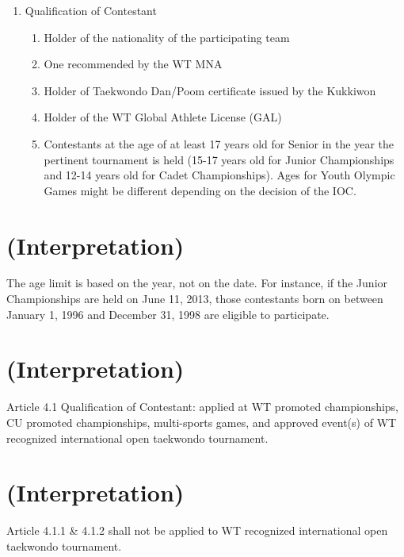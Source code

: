 \documentclass[
]{report}
\begin{document}
\begin{enumerate}
\item
  Qualification of Contestant

  \begin{enumerate}
  \item
    Holder of the nationality of the participating team
  \item
    One recommended by the WT MNA
  \item
    Holder of Taekwondo Dan/Poom certificate issued by the Kukkiwon
  \item
    Holder of the WT Global Athlete License (GAL)
  \item
    Contestants at the age of at least 17 years old for Senior in the
    year the pertinent tournament is held (15-17 years old for Junior
    Championships and 12-14 years old for Cadet Championships). Ages for
    Youth Olympic Games might be different depending on the decision of
    the IOC.
  \end{enumerate}
\end{enumerate}

\section{(Interpretation)}\label{interpretation-1}

The age limit is based on the year, not on the date. For instance, if
the Junior Championships are held on June 11, 2013, those contestants
born on between January 1, 1996 and December 31, 1998 are eligible to
participate.

\section{(Interpretation)}\label{interpretation-2}

Article 4.1 Qualification of Contestant: applied at WT promoted
championships, CU promoted championships, multi-sports games, and
approved event(s) of WT recognized international open taekwondo
tournament.

\section{(Interpretation)}\label{interpretation-3}

Article 4.1.1 \& 4.1.2 shall not be applied to WT recognized
international open taekwondo tournament.
\end{document}
